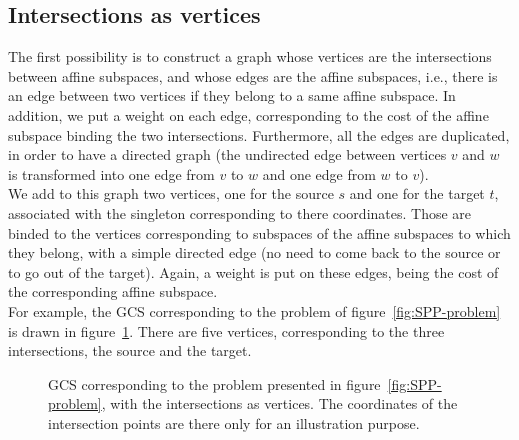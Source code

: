 \documentclass[a4paper, 12pt]{article}
\newlength{\indentsize}
\begin{document}
\subsection{Intersections as vertices}\label{subsec:vertices}
\hspace{\indentsize} The first possibility is to construct a graph whose vertices are the intersections between affine subspaces, and whose edges are the affine subspaces, i.e., there is an edge between two vertices if they belong to a same affine subspace. In addition, we put a weight on each edge, corresponding to the cost of the affine subspace binding the two intersections. Furthermore, all the edges are duplicated, in order to have a directed graph (the undirected edge between vertices $v$ and $w$ is transformed into one edge from $v$ to $w$ and one edge from $w$ to $v$).\\
We add to this graph two vertices, one for the source $s$ and one for the target $t$, associated with the singleton corresponding to there coordinates. Those are binded to the vertices corresponding to subspaces of the affine subspaces to which they belong, with a simple directed edge (no need to come back to the source or to go out of the target). Again, a weight is put on these edges, being the cost of the corresponding affine subspace.\\
For example, the GCS corresponding to the problem of figure~\ref{fig:SPP-problem} is drawn in figure~\ref{fig:vertices}. There are five vertices, corresponding to the three intersections, the source and the target.

\begin{figure}[!htb]
    \centering
    \caption{GCS corresponding to the problem presented in figure~\ref{fig:SPP-problem}, with the intersections as vertices. The coordinates of the intersection points are there only for an illustration purpose.}\label{fig:vertices}
\end{figure}
\end{document}
